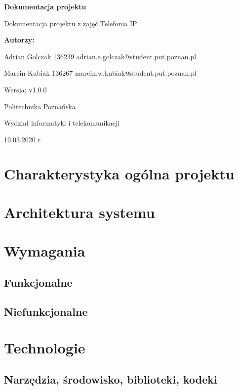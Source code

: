 \documentclass{article}
\newcommand{\version}{v1.0.0}
\begin{document}
\begin{titlepage}
		\begin{center}
		
			\huge
			\textbf{Dokumentacja projektu}
			
			\vspace{0.5cm}
			
			\large
			Dokumentacja projektu z zajęć Telefonia IP
			
			\vspace{2.4cm}
			
			\LARGE
			\textbf{Autorzy:}
			
			\vspace{0.3cm}
			
			Adrian Golczak 136239
			adrian.e.golczak@student.put.poznan.pl
			
			\vspace{0.3cm}
			
			Marcin Kubiak 136267
			marcin.w.kubiak@student.put.poznan.pl
			
			\vfill
			
			\normalsize
			Wersja: \version
			
			\vspace{2cm}
			
			\LARGE
			Politechnika Poznańska
					
			\vspace{0.3cm}
			
			\large
			Wydział informatyki i telekomunikacji
			
			\vspace{0.6cm}
			
			19.03.2020 r.
			
		\end{center}
\end{titlepage}
\tableofcontents
\newpage
\section{Charakterystyka ogólna projektu}

\newpage
\section{Architektura systemu}

\section{Wymagania}
\subsection{Funkcjonalne}

\subsection{Niefunkcjonalne}

\section{Technologie}
\subsection{Narzędzia, środowisko, biblioteki, kodeki}

\end{document}
